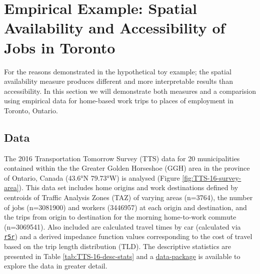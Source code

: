 \documentclass[]{elsarticle} %
\begin{document}
\hypertarget{empirical-example-spatial-availability-and-accessibility-of-jobs-in-toronto}{%
\section{Empirical Example: Spatial Availability and Accessibility of
Jobs in
Toronto}\label{empirical-example-spatial-availability-and-accessibility-of-jobs-in-toronto}}

For the reasons demonstrated in the hypothetical toy example; the
spatial availability measure produces different and more interpretable
results than accessibility. In this section we will demonstrate both
measures and a comparision using empirical data for home-based work
trips to places of employment in Toronto, Ontario.

\hypertarget{data}{%
\subsection{Data}\label{data}}

The 2016 Transportation Tomorrow Survey (TTS) data for 20 municipalities
contained within the the Greater Golden Horseshoe (GGH) area in the
province of Ontario, Canada (43.6°N 79.73°W) is analysed (Figure
\ref{fig:TTS-16-survey-area}). This data set includes home origins and
work destinations defined by centroids of Traffic Analysis Zones (TAZ)
of varying areas (n=3764), the number of jobs (n=3081900) and workers
(3446957) at each origin and destination, and the trips from origin to
destination for the morning home-to-work commute (n=3069541). Also
included are calculated travel times by car (calculated via
\href{https://github.com/ipeaGIT/r5r}{\texttt{r5r}}) and a derived
impedance function values corresponding to the cost of travel based on
the trip length distribution (TLD). The descriptive statistics are
presented in Table \ref{tab:TTS-16-desc-stats} and a
\href{https://github.com/soukhova/AccessPack}{data-package} is available
to explore the data in greater detail.
\end{document}
